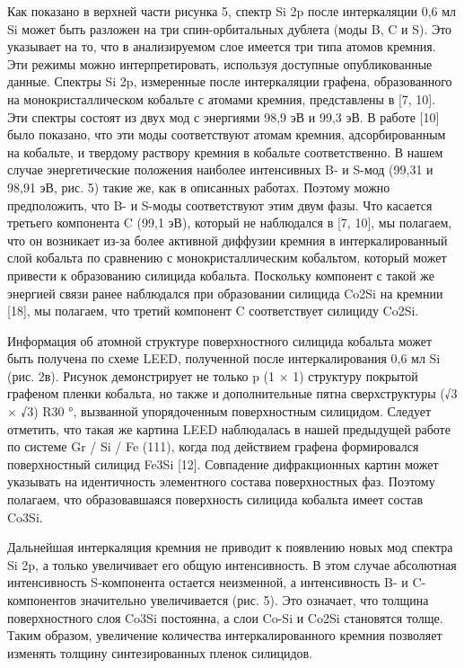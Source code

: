 Как показано в верхней части рисунка 5, спектр Si 2p после интеркаляции 0,6 мл Si может быть разложен на три спин-орбитальных дублета (моды B, C и S). Это указывает на то, что в анализируемом слое имеется три типа атомов кремния. Эти режимы можно интерпретировать, используя доступные опубликованные данные. Спектры Si 2p, измеренные после интеркаляции графена, образованного на монокристаллическом кобальте с атомами кремния, представлены в [7, 10]. Эти спектры состоят из двух мод с энергиями 98,9 эВ и 99,3 эВ. В работе [10] было показано, что эти моды соответствуют атомам кремния, адсорбированным на кобальте, и твердому раствору кремния в кобальте соответственно. В нашем случае энергетические положения наиболее интенсивных B- и S-мод (99,31 и 98,91 эВ, рис. 5) такие же, как в описанных работах. Поэтому можно предположить, что B- и S-моды соответствуют этим двум фазы. Что касается третьего компонента C (99,1 эВ), который не наблюдался в [7, 10], мы полагаем, что он возникает из-за более активной диффузии кремния в интеркалированный слой кобальта по сравнению с монокристаллическим кобальтом, который может привести к образованию силицида кобальта. Поскольку компонент с такой же энергией связи ранее наблюдался при образовании силицида Co2Si на кремнии [18], мы полагаем, что третий компонент C соответствует силициду Co2Si.

Информация об атомной структуре поверхностного силицида кобальта может быть получена по схеме LEED, полученной после интеркалирования 0,6 мл Si (рис. 2в). Рисунок демонстрирует не только p (1 × 1) структуру покрытой графеном пленки кобальта, но также и дополнительные пятна сверхструктуры (√3 × √3) R30 °, вызванной упорядоченным поверхностным силицидом. Следует отметить, что такая же картина LEED наблюдалась в нашей предыдущей работе по системе Gr / Si / Fe (111), когда под действием графена формировался поверхностный силицид Fe3Si [12]. Совпадение дифракционных картин может указывать на идентичность элементного состава поверхностных фаз. Поэтому полагаем, что образовавшаяся поверхность силицида кобальта имеет состав Co3Si.

Дальнейшая интеркаляция кремния не приводит к появлению новых мод спектра Si 2p, а только увеличивает его общую интенсивность. В этом случае абсолютная интенсивность S-компонента остается неизменной, а интенсивность B- и C-компонентов значительно увеличивается (рис. 5). Это означает, что толщина поверхностного слоя Co3Si постоянна, а слои Co-Si и Co2Si становятся толще. Таким образом, увеличение количества интеркалированного кремния позволяет изменять толщину синтезированных пленок силицидов.

